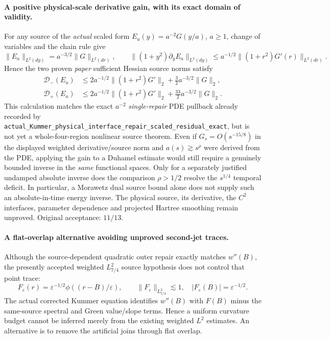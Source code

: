 \documentclass[11pt]{amsart}
\begin{document}
\paragraph{A positive physical-scale derivative gain, with its exact domain of validity.}
For any source of the \emph{actual} scaled form
\(E_a(y)=a^{-2}G(y/a)\), \(a\ge1\),
change of variables and the chain rule give
\[
 \|E_a\|_{L^2(dy)}=a^{-3/2}\|G\|_{L^2(dr)},
 \qquad
 \|(1+y^2)\partial_yE_a\|_{L^2(dy)}
 \le a^{-1/2}\|(1+r^2)G'(r)\|_{L^2(dr)}.
\]
Hence the two proven \emph{paper} sufficient Hessian source norms
satisfy
\[
 \begin{split}
 \mathcal D_-(E_a)&\le
    2a^{-1/2}\|(1+r^2)G'\|_2+\tfrac32a^{-3/2}\|G\|_2,\\
 \mathcal D_+(E_a)&\le
    2a^{-1/2}\|(1+r^2)G'\|_2
          +\tfrac{33}2a^{-3/2}\|G\|_2 .
 \end{split}
\]
This calculation matches the exact \(a^{-2}\)
\emph{single-repair} PDE pullback already recorded by
\texttt{actual\_Kummer\_physical\_interface\_repair\_scaled\_residual\_exact},
but is not yet a whole-four-region nonlinear source theorem.
Even if \(G_s=O(s^{-15/8})\) in the displayed weighted
derivative/source norm and \(a(s)\gtrsim s^\rho\)
were derived from the PDE, applying the gain to a
Duhamel estimate would still require a genuinely
bounded inverse in the \emph{same} functional spaces.
Only for a separately justified undamped absolute
inverse does the comparison \(\rho>1/2\) resolve the
\(s^{1/4}\) temporal deficit. In particular, a
Morawetz dual source bound alone does not supply such
an absolute-in-time energy inverse.
The physical source, its derivative, the \(C^2\)
interfaces, parameter dependence and projected Hartree
smoothing remain unproved. Original acceptance: \(11/13\).


\paragraph{A flat-overlap alternative avoiding unproved second-jet traces.}
Although the source-dependent quadratic outer repair exactly matches
\(w''(B)\), the presently accepted weighted \(L^2_{7/4}\)
source hypothesis does not control that point trace:
\[
 F_\varepsilon(r)=\varepsilon^{-1/2}
   \phi((r-B)/\varepsilon),\qquad
 \|F_\varepsilon\|_{L^2_{7/4}}\lesssim1,\quad
 |F_\varepsilon(B)|=\varepsilon^{-1/2}.
\]
The actual corrected Kummer equation identifies
\(w''(B)\) with \(F(B)\) minus the same-source
spectral and Green value/slope terms. Hence a uniform
curvature budget cannot be inferred merely from the
existing weighted \(L^2\) estimates. An alternative is
to remove the artificial joins through flat overlap.
\end{document}
